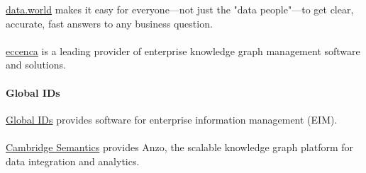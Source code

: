 \href{https://data.world}{data.world} makes it easy for everyone—not just the "data people"—to get clear, accurate,
fast answers to any business question.

\paragraph{\eccenca}
\label{eccenca}

\href{https://eccenca.com/}{eccenca} is a leading provider of enterprise knowledge graph management
software and solutions.

\paragraph{Global IDs}
\label{globalids}

\href{https://www.globalids.com/}{Global IDs} provides software for enterprise information management (EIM).

\paragraph{\cambridgesemantics}
\label{cambridgesemantics}

\href{https://www.cambridgesemantics.com/}{Cambridge Semantics} provides Anzo,
the scalable knowledge graph platform for data integration and analytics.




